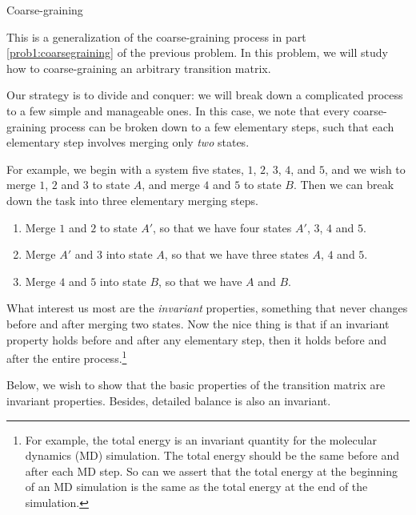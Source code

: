 \documentclass[12pt]{article}
\begin{document}
\begin{problem}{Coarse-graining}


This is a generalization of the coarse-graining process
in part \ref{prob1:coarsegraining} of the previous problem.
%
In this problem,
we will study how to coarse-graining
an arbitrary transition matrix.

Our strategy is to divide and conquer:
we will break down a complicated process
to a few simple and manageable ones.
%
In this case, we note that every coarse-graining process
can be broken down to a few elementary steps,
such that each elementary step
involves merging only \emph{two} states.

For example, we begin with a system five states,
$1$, $2$, $3$, $4$, and $5$,
and we wish to merge $1$, $2$ and $3$
to state $A$, and merge $4$ and $5$
to state $B$.
%
Then we can break down the task into
three elementary merging steps.
\begin{enumerate}
  \item
    Merge $1$ and $2$ to state $A'$,
    so that we have four states
    $A'$, $3$, $4$ and $5$.

  \item
    Merge $A'$ and $3$ into state $A$,
    so that we have three states
    $A$, $4$ and $5$.

  \item
    Merge $4$ and $5$ into state $B$,
    so that we have
    $A$ and $B$.
\end{enumerate}

What interest us most are the \emph{invariant} properties,
something that never changes before and after
merging two states.
%
Now the nice thing is that if an invariant property
holds before and after any elementary step,
then it holds before and after the entire
process.\footnote{For example,
  the total energy is an invariant quantity
  for the molecular dynamics (MD) simulation.
  The total energy should be the same before and after
  each MD step. So can we assert that the total
  energy at the beginning of an MD simulation
  is the same as the total energy at the end
  of the simulation.
}

Below, we wish to show that the basic properties
of the transition matrix are invariant properties.
%
Besides, detailed balance is also an invariant.



%
%



\end{problem}
\end{document}
